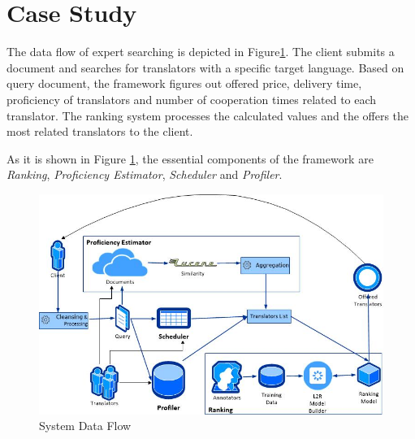 \section{Case Study}
\label{sec:casestudy}
The data flow of expert searching is depicted in Figure\ref{fig:architecture}. The client submits a document and searches for translators with a specific target language. Based on query document, the framework figures out offered price, delivery time, proficiency of translators and number of cooperation times related to each translator. The ranking system processes the calculated values and the offers the most related translators to the client.

As it is shown in Figure \ref{fig:architecture}, the essential components of the framework are \textit{Ranking}, \textit{Proficiency Estimator}, \textit{Scheduler} and \textit{Profiler}.

\begin{figure}[h]
\begin{center}
\includegraphics[scale=0.8]{figures/dataflow.jpg}
\caption{System Data Flow
\label{fig:architecture}}
\end{center}
\end{figure}

